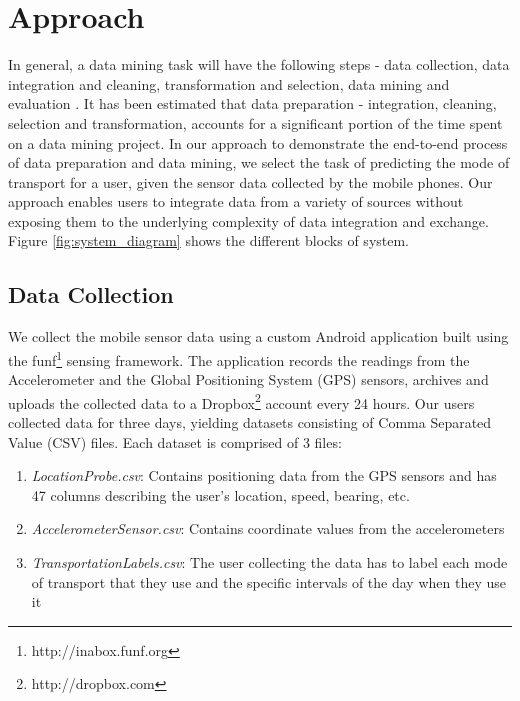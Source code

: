 \section{Approach}

In general, a data mining task will have the following steps - data collection, data integration and cleaning, transformation and selection, data mining and evaluation \cite{Fayyad:1996:DMK:257938.257942}. It has been estimated that data preparation - integration, cleaning, selection and transformation, accounts for a significant portion of the time spent on a data mining project. In our approach to demonstrate the end-to-end process of data preparation and data mining, we select the task of predicting the mode of transport for a user, given the sensor data collected by the mobile phones. Our approach enables users to integrate data from a variety of sources without exposing them to the underlying complexity of data integration and exchange. Figure \ref{fig:system_diagram} shows the different blocks of system.
 
\subsection{Data Collection}
We collect the mobile sensor data using a custom Android application built using the funf\footnote{http://inabox.funf.org} sensing framework. The application records the readings from the Accelerometer and the Global Positioning System (GPS) sensors, archives and uploads the collected data to a Dropbox\footnote{http://dropbox.com} account every 24 hours. Our users collected data for three days, yielding datasets consisting of Comma Separated Value (CSV) files. Each dataset is comprised of 3 files:

\begin{enumerate}
  \item \textit{LocationProbe.csv}: Contains positioning data from the GPS sensors and has 47 columns describing the user's location, speed, bearing, etc.
  \item \textit{AccelerometerSensor.csv}: Contains coordinate values from the accelerometers
  \item \textit{TransportationLabels.csv}: The user collecting the data has to label each mode of transport that they use and the specific intervals of the day when they use it
\end{enumerate} 

